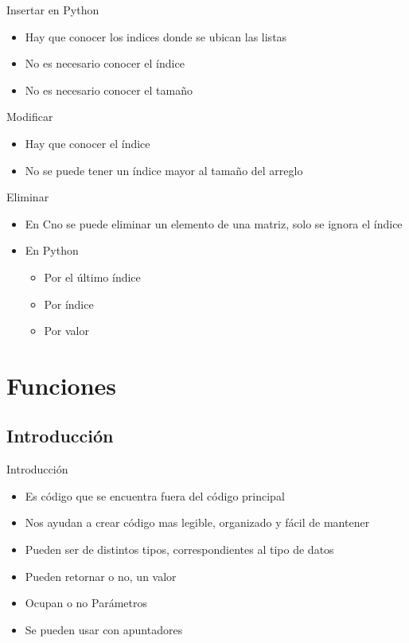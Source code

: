 \documentclass{beamer}
\newcommand{\Rplus}{\protect\hspace{-.1em}\protect\raisebox{.35ex}{\smaller{\smaller\textbf{+}}}}
\newcommand{\Cpp}{\mbox{C\Rplus\Rplus}\hspace{3pt}}
\begin{document}
\begin{frame}{Insertar en Python}
	\begin{itemize}
		\item Hay que conocer los indices donde se ubican las listas
		\item No es necesario conocer el \'indice
		\item No es necesario conocer el tamaño 
	\end{itemize}
\end{frame}

\begin{frame}{Modificar}
	\begin{itemize}
		\item Hay que conocer el \'indice
		\item No se puede tener un \'indice mayor al tamaño del arreglo
	\end{itemize}
\end{frame}

\begin{frame}{Eliminar}
	\begin{itemize}
		\item En \Cpp no se puede eliminar un elemento de una matriz, solo se ignora el \'indice 
		\item En Python
		\begin{itemize}
			\item Por el \'ultimo \'indice
			\item Por \'indice
			\item Por valor
		\end{itemize}
	\end{itemize}
\end{frame}

\section{Funciones}

\subsection{Introducci\'on}

\begin{frame}{Introducci\'on}
	\begin{itemize}
		\item Es c\'odigo que se encuentra fuera del c\'odigo principal
		\item Nos ayudan a crear c\'odigo mas legible, organizado y f\'acil de mantener
		\item Pueden ser de distintos tipos, correspondientes al tipo de datos
		\item Pueden retornar o no, un valor
		\item Ocupan o no Par\'ametros
		\item Se pueden usar con apuntadores
	\end{itemize}
\end{frame}
\end{document}
